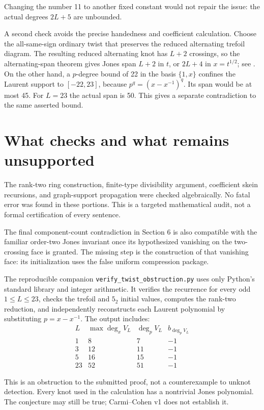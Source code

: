 \documentclass[11pt]{article}
\begin{document}
Changing the number 11 to another fixed constant would not repair the issue: the actual degrees $2L+5$ are unbounded.

A second check avoids the precise handedness and coefficient calculation. Choose the all-same-sign ordinary twist that preserves the reduced alternating trefoil diagram. The resulting reduced alternating knot has $L+2$ crossings, so the alternating-span theorem gives Jones span $L+2$ in $t$, or $2L+4$ in $x=t^{1/2}$; see \cite{Kauffman}. On the other hand, a $p$-degree bound of 22 in the basis $\{1,x\}$ confines the Laurent support to $[-22,23]$, because $p^q=(x-x^{-1})^q$. Its span would be at most 45. For $L=23$ the actual span is 50. This gives a separate contradiction to the same asserted bound.

\section*{What checks and what remains unsupported}
The rank-two ring construction, finite-type divisibility argument, coefficient skein recursions, and graph-support propagation were checked algebraically. No fatal error was found in these portions. This is a targeted mathematical audit, not a formal certification of every sentence.

The final component-count contradiction in Section 6 is also compatible with the familiar order-two Jones invariant once its hypothesized vanishing on the two-crossing face is granted. The missing step is the construction of that vanishing face: its initialization uses the false uniform compression package.

The reproducible companion \texttt{verify\_twist\_obstruction.py} uses only Python's standard library and integer arithmetic. It verifies the recurrence for every odd $1\le L\le23$, checks the trefoil and $5_2$ initial values, computes the rank-two reduction, and independently reconstructs each Laurent polynomial by substituting $p=x-x^{-1}$. The output includes:
\[
\begin{array}{c|r|r|r}
L & \max\deg_x V_L & \deg_p V_L & b_{\deg_p V_L}\\ \hline
1&8&7&-1\\
3&12&11&-1\\
5&16&15&-1\\
23&52&51&-1
\end{array}
\]

This is an obstruction to the submitted proof, not a counterexample to unknot detection. Every knot used in the calculation has a nontrivial Jones polynomial. The conjecture may still be true; Carmi--Cohen v1 does not establish it.
\end{document}
